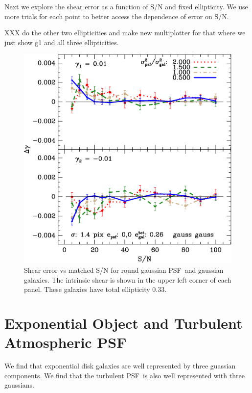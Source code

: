 \documentclass[10pt,preprint]{aastex}
\newcommand{\psf}{PSF}
\begin{document}
Next we explore the shear error as a function of S/N and fixed ellipticity.  We
use more trials for each point to better access the dependence of error on S/N.

XXX do the other two ellipticities and make new multiplotter for that
where we just show g1 and all three ellipticities.

\begin{figure}[h] \centering
\includegraphics[scale=0.7]{figures/gmix-fit-gg05r01-yr-0.005-0.005-diff.eps}

 \caption{Shear error vs matched S/N for round gaussian \psf\ and gaussian
 galaxies. The intrinsic shear is shown in the upper left corner of each panel.
 These galaxies have total ellipticity 0.33.
 \label{fig:gg05r01}}

\end{figure}


\section{Exponential Object and Turbulent Atmospheric \psf}

We find that exponential disk galaxies are well represented by three guassian
components.  We find that the turbulent \psf\ is also well represented with
three gaussians.
\end{document}
